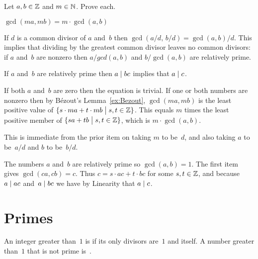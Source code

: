\documentclass{ibl}  %
\begin{document}
\begin{bezoutproof}
\begin{ex}  \label{ex:EuclidsLemma}
Let $a,b\in\mathbb{Z}$ and $m\in\mathbb{N}$. 
Prove each.
\begin{exes}
\item $\gcd(ma,mb)=m\cdot\gcd(a,b)$
\item If $d$ is a common divisor of $a$ and~$b$ then 
  $\gcd(a/d,\,b/d)=\gcd(a,b)/d$.
  This implies that 
  dividing by the greatest common divisor leaves no common divisors:
  if $a$ and~$b$ are nonzero then $a/gcd(a,b)$ and $b/\gcd(a,b)$
  are relatively prime.
\item {}  
  If $a$ and~$b$ are relatively prime then $a\mid bc$ implies that 
  $a\mid c$.
\end{exes}
\begin{ans}
\begin{exes}
\item If both $a$ and~$b$ are zero then the equation is trivial.
  If one or both numbers are nonzero then by 
  B\'ezout's Lemma~\ref{ex:Bezout}, $\gcd(ma,mb)$ is the least
  positive value of $\{s\cdot ma+t\cdot mb \bigm| s,t\in\mathbb{Z}\}$.
  This equals $m$ times the least positive member of 
  $\{sa+tb \bigm| s,t\in\mathbb{Z}\}$, 
  which is $m\cdot\gcd(a,b)$.
\item This is immediate from the prior item on taking $m$ to be~$d$, 
  and also taking $a$ to be~$a/d$ and $b$ to be~$b/d$.     
\item The numbers $a$ and~$b$ are relatively prime so $\gcd(a,b)=1$.
  The first item gives $\gcd(ca,cb)=c$.
  Thus $c=s\cdot ac+t\cdot bc$ for some $s,t\in\mathbb{Z}$, and
  because $a\mid ac$ and~$a\mid bc$ we have by Linearity that
  $a\mid c$.
\end{exes}
\end{ans}
\end{ex}
\end{bezoutproof}











\section{Primes}
\begin{df}
An integer greater than~$1$
is  if its only divisors are~$1$ and itself.
A number greater than~$1$ that is not prime is~.  
\end{df}
\end{document}
